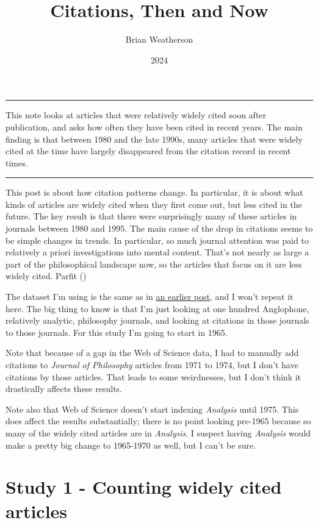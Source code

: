 \documentclass[
  10pt,
  letterpaper,
  DIV=11,
  numbers=noendperiod,
  twoside]{scrartcl}
\title{Citations, Then and Now}
\author{Brian Weatherson}
\date{2024}
\renewenvironment{abstract}
 {\vspace{-1.25cm}
 \quotation\small\noindent\rule{\linewidth}{.5pt}\par\smallskip
 \noindent }
 {\par\noindent\rule{\linewidth}{.5pt}\endquotation}
\begin{document}
\maketitle
\begin{abstract}
This note looks at articles that were relatively widely cited soon after
publication, and asks how often they have been cited in recent years.
The main finding is that between 1980 and the late 1990s, many articles
that were widely cited at the time have largely disappeared from the
citation record in recent times.
\end{abstract}

This post is about how citation patterns change. In particular, it is
about what kinds of articles are widely cited when they first come out,
but less cited in the future. The key result is that there were
surprisingly many of these articles in journals between 1980 and 1995.
The main cause of the drop in citations seems to be simple changes in
trends. In particular, so much journal attention was paid to relatively
a priori investigations into mental content. That's not nearly as large
a part of the philosophical landscape now, so the articles that focus on
it are less widely cited. Parfit
()

The dataset I'm using is the same as in
\href{http://brian.weatherson.org/quarto/posts/citations-raw-data/citations.html}{an
earlier post}, and I won't repeat it here. The big thing to know is that
I'm just looking at one hundred Anglophone, relatively analytic,
philosophy journals, and looking at citations in those journals to those
journals. For this study I'm going to start in 1965.

Note that because of a gap in the Web of Science data, I had to manually
add citations to \emph{Journal of Philosophy} articles from 1971 to
1974, but I don't have citations by those articles. That leads to some
weirdnesses, but I don't think it drastically affects these results.

Note also that Web of Science doesn't start indexing \emph{Analysis}
until 1975. This does affect the results substantially; there is no
point looking pre-1965 because so many of the widely cited articles are
in \emph{Analysis}. I suspect having \emph{Analysis} would make a pretty
big change to 1965-1970 as well, but I can't be sure.

\section{Study 1 - Counting widely cited articles}\label{sec-study-one}
\end{document}
